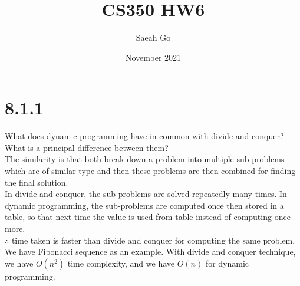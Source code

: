 \documentclass{article}
\title{CS350 HW6}
\author{Saeah Go}
\date{November 2021}
\begin{document}
\maketitle

\section{8.1.1}
What does dynamic programming have in common with divide-and-conquer? What is a principal difference between them? \\
\indent The similarity is that both break down a problem into multiple sub problems which are of similar type and then these problems are then combined for finding the final solution. \\
\indent In divide and conquer, the sub-problems are solved repeatedly many times. In dynamic programming, the sub-problems are computed once then stored in a table, so that next time the value is used from table instead of computing once more. \\
$\therefore$ time taken is faster than divide and conquer for computing the same problem. \\
\indent We have Fibonacci sequence as an example. With divide and conquer technique, we have $O(n^2)$ time complexity, and we have $O(n)$ for dynamic programming. 
\end{document}
